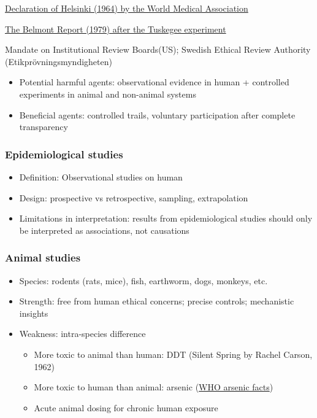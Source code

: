\documentclass[
  letterpaper,
  DIV=11,
  numbers=noendperiod]{scrartcl}
\begin{document}
\href{https://youtu.be/dFmI3wNzL8k?si=A5ROtryw-QfJehx3}{Declaration of
Helsinki (1964) by the World Medical Association}

\href{https://youtu.be/M6AKIIhoFn4?si=L35kK5pfyzD-bO-t}{The Belmont
Report (1979) after the Tuskegee experiment}

Mandate on Institutional Review Boards(US); Swedish Ethical Review
Authority (Etikprövningsmyndigheten)

\begin{itemize}
\item
  Potential harmful agents: observational evidence in human + controlled
  experiments in animal and non-animal systems
\item
  Beneficial agents: controlled trails, voluntary participation after
  complete transparency
\end{itemize}

\subsubsection{Epidemiological studies}\label{epidemiological-studies}

\begin{itemize}
\item
  Definition: Observational studies on human
\item
  Design: prospective vs retrospective, sampling, extrapolation
\item
  Limitations in interpretation: results from epidemiological studies
  should only be interpreted as associations, not causations
\end{itemize}

\subsubsection{Animal studies}\label{animal-studies}

\begin{itemize}
\item
  Species: rodents (rats, mice), fish, earthworm, dogs, monkeys, etc.
\item
  Strength: free from human ethical concerns; precise controls;
  mechanistic insights
\item
  Weakness: intra-species difference

  \begin{itemize}
  \item
    More toxic to animal than human: DDT (Silent Spring by Rachel
    Carson, 1962)
  \item
    More toxic to human than animal: arsenic
    (\href{https://www.who.int/news-room/fact-sheets/detail/arsenic}{WHO
    arsenic facts})
  \item
    Acute animal dosing for chronic human exposure
  \end{itemize}
\end{itemize}
\end{document}

